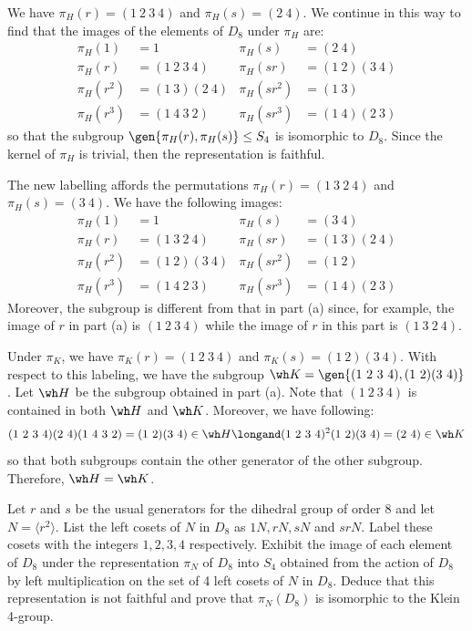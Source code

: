 \begin{solalph}
	\item We have $\pi_H(r) = (1\ 2\ 3\ 4)$ and $\pi_H(s) = (2\ 4)$. We continue in this way to find that the images of the elements of $D_8$ under $\pi_H$ are:
	\begin{align*}
		\pi_H(1) & = 1 & \pi_H(s) & = (2\ 4) \\
		\pi_H(r) & = (1\ 2\ 3\ 4) & \pi_H(sr) & = (1\ 2)(3\ 4) \\
		\pi_H(r^2) & = (1\ 3)(2\ 4) & \pi_H(sr^2) & = (1\ 3) \\
		\pi_H(r^3) & = (1\ 4\ 3\ 2) & \pi_H(sr^3) & = (1\ 4)(2\ 3)
	\end{align*}
	so that the subgroup $\gen{\pi_H(r), \pi_H(s)} \leq S_4$ is isomorphic to $D_8$. Since the kernel of $\pi_H$ is trivial, then the representation is faithful.
	\item The new labelling affords the permutations $\pi_H(r) = (1\ 3\ 2\ 4)$ and $\pi_H(s) = (3\ 4)$. We have the following images:
	\begin{align*}
		\pi_H(1) & = 1 & \pi_H(s) & = (3\ 4) \\
		\pi_H(r) & = (1\ 3\ 2\ 4) & \pi_H(sr) & = (1\ 3)(2\ 4) \\
		\pi_H(r^2) & = (1\ 2)(3\ 4) & \pi_H(sr^2) & = (1\ 2) \\
		\pi_H(r^3) & = (1\ 4\ 2\ 3) & \pi_H(sr^3) & = (1\ 4)(2\ 3)
	\end{align*}
	Moreover, the subgroup is different from that in part (a) since, for example, the image of $r$ in part (a) is $(1\ 2\ 3\ 4)$ while the image of $r$ in this part is $(1\ 3\ 2\ 4)$.
	\item Under $\pi_K$, we have $\pi_K(r) = (1\ 2\ 3\ 4)$ and $\pi_K(s) = (1\ 2)(3\ 4)$. With respect to this labeling, we have the subgroup $\wh K = \gen{(1\ 2\ 3\ 4), (1\ 2)(3\ 4)}$. Let $\wh H$ be the subgroup obtained in part (a). Note that $(1\ 2\ 3\ 4)$ is contained in both $\wh H$ and $\wh K$. Moreover, we have following:
	\[(1\ 2\ 3\ 4)(2\ 4)(1\ 4\ 3\ 2) = (1\ 2)(3\ 4) \in \wh H \longand (1\ 2\ 3\ 4)^2(1\ 2)(3\ 4) = (2\ 4) \in \wh K\]
	so that both subgroups contain the other generator of the other subgroup. Therefore, $\wh H = \wh K$.
\end{solalph}

\newpage

\begin{exercise}
	Let $r$ and $s$ be the usual generators for the dihedral group of order 8 and let $N = \langle r^2 \rangle$. List the left cosets of $N$ in $D_8$ as $1N, rN, sN$ and $srN$. Label these cosets with the integers $1,2,3,4$ respectively. Exhibit the image of each element of $D_8$ under the representation $\pi_N$ of $D_8$ into $S_4$ obtained from the action of $D_8$ by left multiplication on the set of 4 left cosets of $N$ in $D_8$. Deduce that this representation is not faithful and prove that $\pi_N(D_8)$ is isomorphic to the Klein 4-group.
\end{exercise}

